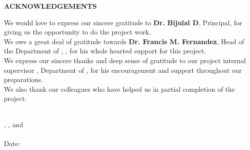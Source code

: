 \thispagestyle{plain}
\begin{center}
 \Large {\bf \uppercase{Acknowledgements}}
\end{center}
\vspace{3\baselineskip}
\justifying
%
%
%
We would love to express our sincere gratitude to 
{\bf Dr. Bijulal D}, Principal,
\University for giving us the opportunity to do the project
work.
\\
 We owe a great deal of gratitude towards {\bf Dr. Francis M. Fernandez}, Head of the Department of \Department, \University, for his whole
hearted support for this project.
\\
 We express our sincere thanks and deep sense of gratitude
to our project internal supervisor {\bf \Supervisor}, Department of \Department, for his encouragement and support throughout our preparations.
\\
We also thank our colleagues who have helped us in partial completion of the project.

\centering
\noindent
\vspace{\baselineskip} \\
\textbf{\firstAuthor}, \textbf{\secondAuthor}, \textbf{\thirdAuthor} and \textbf{\fourthAuthor}\\
\University \\
Date: \reportSubmissionDate
